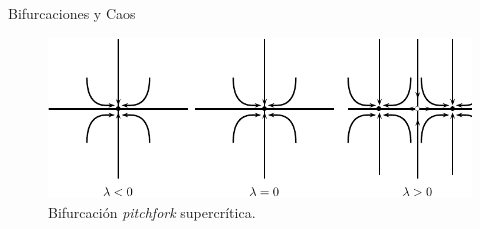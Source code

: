 \documentclass{beamer}
\begin{document}
\begin{frame}{Bifurcaciones y Caos}

\begin{figure} \centering
    \includegraphics[scale=0.9]{../figures/bifurcations-pitchforksupercritical.pdf} 
    \caption{Bifurcación \textit{pitchfork} supercrítica.}
\end{figure}
\end{frame}
\end{document}
